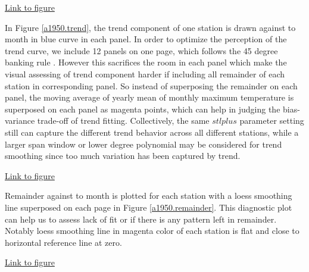 \begin{framed}
\begin{center}
  \href{../plots/a1950/stlplus/t231td2_s21sd1_ffd/a1950.remainder.vs.year.pdf}
  {Link to figure}
  \label{a1950.remainder.vs.year}
\end{center}
\end{framed}


In Figure \href{../plots/a1950/stlplus/t231td2_s21sd1_ffd/a1950.trend.vs.time.pdf}
{\ref*{a1950.trend}}, the trend component of one station is drawn against to 
month in blue curve in each panel. In order to optimize the perception of the 
trend curve, we include 12 panels on one page, which follows the 45 degree banking
rule \cite{clevelandvisualizing}. However this sacrifices the room in each panel
which make the visual assessing of trend component harder if including all 
remainder of each station in corresponding panel. So instead of superposing the
remainder on each panel, the moving average of yearly mean of monthly 
maximum temperature is superposed on each panel as magenta points, which can 
help in judging the bias-variance trade-off of trend fitting.
Collectively, the same $stlplus$ parameter setting still can capture the different
trend behavior across all different stations, while a larger span window or lower
degree polynomial may be considered for trend smoothing since too much variation
has been captured by trend.

\begin{framed}
\begin{center}
  \href{../plots/a1950/stlplus/t231td2_s21sd1_ffd/a1950.trend.vs.time.pdf}
  {Link to figure}
  \label{a1950.trend}
\end{center}
\end{framed}

Remainder against to month is plotted for each station with a loess smoothing 
line superposed on each page in Figure 
\href{../plots/a1950/stlplus/t231td2_s21sd1_ffd/a1950.remainder.vs.time.pdf}
{\ref*{a1950.remainder}}. This diagnostic plot can help us to assess lack of fit
or if there is any pattern left in remainder. Notably loess smoothing line in 
magenta color of each station is flat and close to horizontal reference line at 
zero.  

\begin{framed}
\begin{center}
  \href{../plots/a1950/stlplus/t231td2_s21sd1_ffd/a1950.remainder.vs.time.pdf}
  {Link to figure}
  \label{a1950.remainder}
\end{center}
\end{framed}

